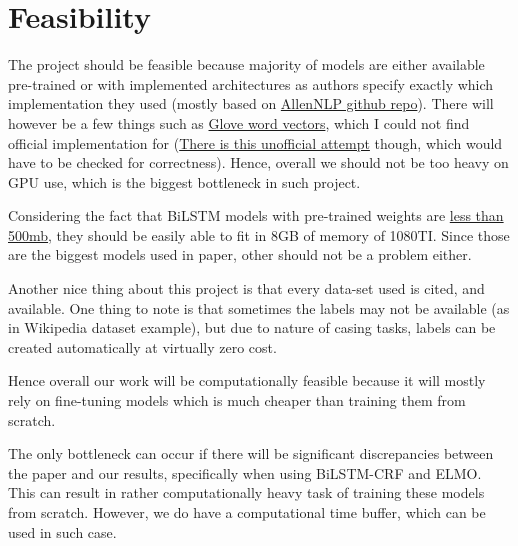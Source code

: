 \documentclass{article}
\begin{document}
\section{Feasibility}
The project should be feasible because majority of models are either available pre-trained or with implemented architectures as authors specify exactly which implementation they used (mostly based on \href{https://github.com/allenai/allennlp}{AllenNLP github repo}).
There will however be a few things such as \href{https://nlp.stanford.edu/pubs/glove.pdf}{Glove word vectors}, which I could not find official implementation for (\href{https://github.com/hans/glove.py}{There is this unofficial attempt} though, which would have to be checked for correctness). Hence, overall we should not be too heavy on GPU use, which is the biggest bottleneck in such project.

Considering the fact that BiLSTM models with pre-trained weights are \href{https://github.com/UKPLab/emnlp2017-bilstm-cnn-crf/blob/master/docs/Pretrained_Models.md}{less than 500mb}, they should be easily able to fit in 8GB of memory of 1080TI. Since those are the biggest models used in paper, other should not be a problem either.

Another nice thing about this project is that every data-set used is cited, and available. One thing to note is that sometimes the labels may not be available (as in Wikipedia dataset example), but due to nature of casing tasks, labels can be created automatically at virtually zero cost.

Hence overall our work will be computationally feasible because it will mostly rely on fine-tuning models which is much cheaper than training them from scratch.

The only bottleneck can occur if there will be significant discrepancies between the paper and our results, specifically when using BiLSTM-CRF and ELMO. This can result in rather computationally heavy task of training these models from scratch. However, we do have a computational time buffer, which can be used in such case.
\end{document}
